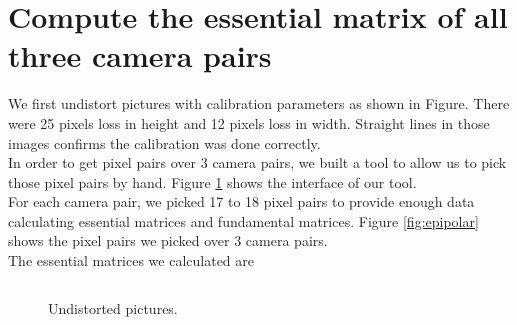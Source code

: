 \documentclass[10pt,twocolumn,letterpaper]{article}
\begin{document}
\section{Compute the essential matrix of all three camera pairs}

We first undistort pictures with calibration parameters as shown in Figure. There were 25 pixels loss in height and 12 pixels loss in width. Straight lines in those images confirms the calibration was done correctly.\\

In order to get pixel pairs over 3 camera pairs, we built a tool to allow us to pick those pixel pairs by hand. Figure \ref{fig:undistorted} shows the interface of our tool.\\

For each camera pair, we picked 17 to 18 pixel pairs to provide enough data calculating essential matrices and fundamental matrices. Figure \ref{fig:epipolar} shows the pixel pairs we picked over 3 camera pairs.\\

The essential matrices we calculated are

$$

$$


\begin{figure}[t]
\centering
{}

\caption{Undistorted pictures.}
\label{fig:undistorted}
\end{figure}
\end{document}
